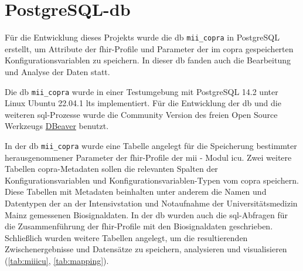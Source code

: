 \section{PostgreSQL-\acs{db}} \label{sec:database}

Für die Entwicklung dieses Projekts wurde die \ac{db} \texttt{mii\_copra} in PostgreSQL erstellt, um Attribute der \ac{fhir}-Profile und Parameter der im \ac{copra} gespeicherten Konfigurationsvariablen zu speichern. In dieser \ac{db} fanden auch die Bearbeitung und Analyse der Daten statt.

Die \ac{db} \texttt{mii\_copra} wurde in einer Testumgebung mit PostgreSQL 14.2 unter Linux Ubuntu 22.04.1 \ac{lts} implementiert. Für die Entwicklung der \ac{db} und die weiteren \ac{sql}-Prozesse wurde die Community Version des freien Open Source Werkzeugs \href{https://dbeaver.io/}{DBeaver} benutzt.

In der \ac{db} \texttt{mii\_copra} wurde eine Tabelle angelegt für die Speicherung bestimmter herausgenommener Parameter der \ac{fhir}-Profile der \ac{mii} - Modul \ac{icu}. Zwei weitere Tabellen \ac{copra}-Metadaten sollen die relevanten Spalten der Konfigurationsvariablen und Konfigurationsvariablen-Typen vom \ac{copra} speichern. Diese Tabellen mit Metadaten beinhalten unter anderem die Namen und Datentypen der an der Intensivstation und Notaufnahme der Universitätsmedizin Mainz gemessenen Biosignaldaten. In der \ac{db} wurden auch die \ac{sql}-Abfragen für die Zusammenführung der \ac{fhir}-Profile mit den Biosignaldaten geschrieben. Schließlich wurden weitere Tabellen angelegt, um die resultierenden Zwischenergebnisse und Datensätze zu speichern, analysieren und visualisieren (\ref{tab:miiicu}, \ref{tab:mapping}).